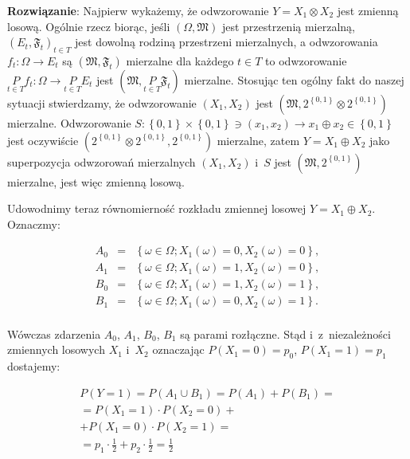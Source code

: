 \documentclass[a4paper,10pt, twocolumn]{article}
\begin{document}
\textbf{Rozwiązanie}: Najpierw wykażemy, że odwzorowanie $Y = X_{1} \otimes X_{2}$ jest zmienną losową. Ogólnie rzecz biorąc, jeśli $(\Omega, \mathfrak{M})$ jest przestrzenią mierzalną, $(E_{t}, \mathfrak{F}_{t})_{t \in T}$ jest dowolną rodziną przestrzeni mierzalnych, a odwzorowania $f_{t}: \Omega \rightarrow E_{t}$ są $(\mathfrak{M}, \mathfrak{F}_{t})$ mierzalne dla każdego $t \in T$ to odwzorowanie $\underset{t \in T}{P} f_{t}: \Omega \rightarrow \underset{t \in T}{P} E_{t}$ jest $(\mathfrak{M}, \underset{t \in T}{P} \mathfrak{F}_{t})$ mierzalne. Stosując ten ogólny fakt do naszej sytuacji stwierdzamy, że odwzorowanie $(X_{1}, X_{2})$ jest $(\mathfrak{M}, 2^{\left\{0,1\right\}} \otimes  2^{\left\{0,1\right\}})$ mierzalne. Odwzorowanie $S: \left\{0,1\right\} \times \left\{0,1\right\} \ni (x_{1}, x_{2}) \rightarrow x_{1} \oplus x_{2} \in \left\{0,1\right\}$ jest oczywiście $(2^{\left\{0,1\right\}} \otimes  2^{\left\{0,1\right\}},  2^{\left\{0,1\right\}})$ mierzalne, zatem $Y = X_{1} \oplus X_{2}$ jako superpozycja odwzorowań mierzalnych $(X_{1}, X_{2})$ i~$S$ jest $(\mathfrak{M},  2^{\left\{0,1\right\}})$ mierzalne, jest więc zmienną losową.

Udowodnimy teraz równomierność rozkładu zmiennej losowej $Y = X_{1} \oplus X_{2}$. Oznaczmy: 

\begin{equation*}
 \begin{array}{lcl} A_{0} & = & \left\{\omega \in \Omega; X_{1}(\omega) = 0, X_{2}(\omega) = 0 \right\}, \\ A_{1} & = & \left\{\omega \in \Omega; X_{1}(\omega) = 1, X_{2}(\omega) = 0 \right\}, \\ B_{0} & = & \left\{\omega \in \Omega; X_{1}(\omega) = 1, X_{2}(\omega) = 1 \right\}, \\ B_{1} & = & \left\{\omega \in \Omega; X_{1}(\omega) = 0, X_{2}(\omega) = 1 \right\}. \\\end{array}
\end{equation*}

\noindent Wówczas zdarzenia $A_{0}$, $A_{1}$, $B_{0}$, $B_{1}$ są parami rozłączne. Stąd i~z~niezależności zmiennych losowych $X_{1}$ i~$X_{2}$ oznaczając $P(X_{1} = 0) = p_{0}$, $P(X_{1} = 1) = p_{1}$ dostajemy:

\begin{equation*}
 \begin{array}{c} P(Y = 1) = P(A_{1} \cup B_{1}) = P(A_{1}) + P(B_{1}) = \\ = P(X_{1} = 1) \cdot P(X_{2} = 0) + \\ + P(X_{1} = 0) \cdot P(X_{2} = 1) = \\ = p_{1} \cdot \frac{1}{2} + p_{2} \cdot \frac{1}{2} = \frac{1}{2} \\ \end{array}
\end{equation*}
\end{document}

